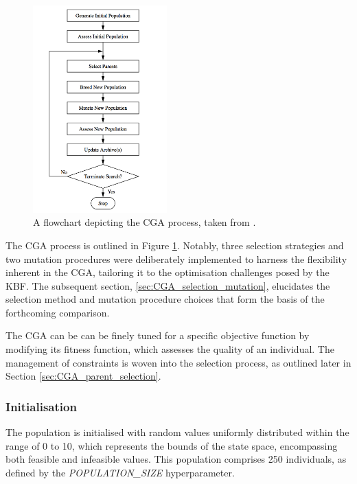 \documentclass[10pt]{article}
\begin{document}
\begin{multicols}{2}
\begin{figure}[H]
    \centering
    \includegraphics[width=0.46\textwidth]{../figures/Permanent Images/Flowchart.png}
    \captionsetup{justification=centering}
    \caption{A flowchart depicting the CGA process, taken from \cite{parks2023geneticalgorithms}.}
    \label{fig:GAprocess}
\end{figure}

The CGA process is outlined in Figure \ref{fig:GAprocess}. Notably, three selection strategies and two mutation procedures were deliberately implemented to harness the flexibility inherent in the CGA, tailoring it to the optimisation challenges posed by the KBF. The subsequent section, \ref{sec:CGA_selection_mutation}, elucidates the selection method and mutation procedure choices that form the basis of the forthcoming comparison.

The CGA can be can be finely tuned for a specific objective function by modifying its fitness function, which assesses the quality of an individual. The management of constraints is woven into the selection process, as outlined later in Section \ref{sec:CGA_parent_selection}.

\subsubsection{Initialisation}

The population is initialised with random values uniformly distributed within the range of 0 to 10, which represents the bounds of the state space, encompassing both feasible and infeasible values. This population comprises 250 individuals, as defined by the \textit{POPULATION\_SIZE} hyperparameter. 


\end{multicols}
\end{document}
